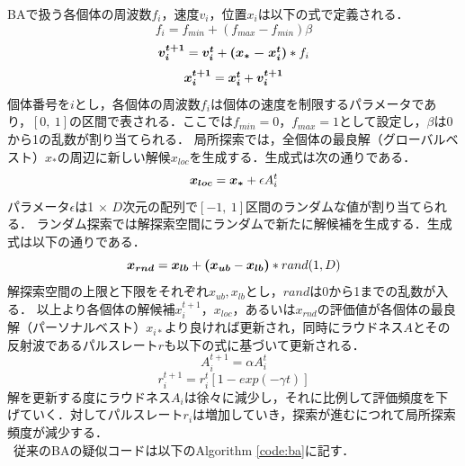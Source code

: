 \documentclass[a4j,11pt]{jarticle}
\begin{document}
BAで扱う各個体の周波数$f_i$，速度$v_i$，位置$x_i$は以下の式で定義される．
\begin{equation}
f_{i} =f_{min}+(f_{max}-f_{min}) \beta
\label{eq:freq} 
\end{equation}
\begin{equation}
\mbox{\boldmath $v_i^{t+1}$}=\mbox{\boldmath $v_i^{t}$}+\mbox{\boldmath $(x_*-x_i^t)$}* f_i
\label{eq:ba-vi}
\end{equation}
\begin{equation}
\mbox{\boldmath $x_i^{t+1}$}=\mbox{\boldmath $x_i^{t}$}+\mbox{\boldmath $v_i^{t+1}$}
\label{eq:ba-xi}
\end{equation}
個体番号を$i$とし，各個体の周波数${f_i}$は個体の速度を制限するパラメータであり，$[0, \ 1]$の区間で表される．ここでは${f_{min}=0}$，${f_{max}=1}$として設定し，$\beta$は0から1の乱数が割り当てられる．
局所探索では，全個体の最良解（グローバルベスト）\mbox{\boldmath $x_*$}の周辺に新しい解候${x_{loc}}$を生成する．生成式は次の通りである．
\begin{equation}
\label{eq:ba-loc}
\mbox{\boldmath $x_{loc}$}=\mbox{\boldmath $x_*$} + \epsilon A_i^t
\end{equation}
パラメータ$\epsilon$は1 $\times$ $D$次元の配列で$[-1, \ 1]$区間のランダムな値が割り当てられる． ランダム探索では解探索空間にランダムで新たに解候補を生成する．生成式は以下の通りである．
\begin{equation}
\label{eq:ba-rnd}
\mbox{\boldmath $x_{rnd}$}=\mbox{\boldmath $x_{lb}$} + \mbox{\boldmath $(x_{ub}$} - \mbox{\boldmath $x_{lb})$}*rand(1,D)
\end{equation}
解探索空間の上限と下限をそれぞれ$x_{ub}, x_{lb}$とし，$rand$は0から1までの乱数が入る．
以上より各個体の解候補${x_i^{t+1}}$，${x_{loc}}$，あるいは$x_{rnd}$の評価値が各個体の最良解（パーソナルベスト）$x_{i*}$より良ければ更新され，同時にラウドネス$A$とその反射波であるパルスレート$r$も以下の式に基づいて更新される．
\begin{equation}
\label{eq:loud}
A_i^{t+1}= \alpha A_i^t
\end{equation}
\begin{equation}
\label{eq:pulse}
r_i^{t+1}=r_i^t[1-exp(- \gamma t)]
\end{equation}
解を更新する度にラウドネス$A_i$は徐々に減少し，それに比例して評価頻度を下げていく．対してパルスレート$r_i$は増加していき，探索が進むにつれて局所探索頻度が減少する．\\ \
従来のBAの疑似コードは以下のAlgorithm \ref{code:ba}に記す．
\end{document}
